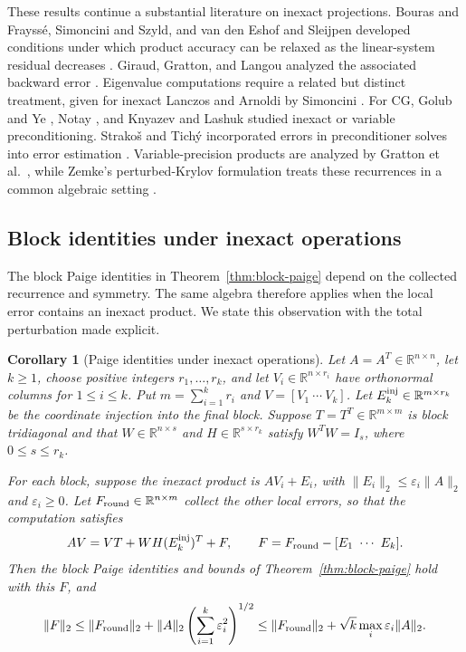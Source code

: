 \documentclass[11pt]{article}
\newtheorem{corollary}{Corollary}
\theoremstyle{definition}
\newcommand{\R}{\mathbb{R}}
\begin{document}
These results continue a substantial literature on inexact projections.
Bouras and Frayss\'e, Simoncini and Szyld, and van den Eshof and Sleijpen
developed conditions under which product accuracy can be relaxed as the
linear-system residual decreases
\cite{BourasFraysse2005,SimonciniSzyld2003,VanDenEshofSleijpen2004}.
Giraud, Gratton, and Langou analyzed the associated backward error
\cite{GiraudGrattonLangou2007}. Eigenvalue computations require a related
but distinct treatment, given for inexact Lanczos and Arnoldi by Simoncini
\cite{Simoncini2005}.
For CG, Golub and Ye \cite{GolubYe1999}, Notay \cite{Notay2000}, and
Knyazev and Lashuk \cite{KnyazevLashuk2007} studied inexact or variable
preconditioning. Strako\v{s} and Tich\'y incorporated errors in
preconditioner solves into error estimation \cite{StrakosTichy2005}.
Variable-precision products are analyzed by Gratton et al.\
\cite{GrattonSimonTitleyPeloquinToint2021}, while Zemke's perturbed-Krylov
formulation treats these recurrences in a common algebraic setting \cite{Zemke2007}.

\subsection{Block identities under inexact operations}

The block Paige identities in Theorem~\ref{thm:block-paige} depend on the
collected recurrence and symmetry. The same algebra therefore applies when
the local error contains an inexact product. We state this observation with
the total perturbation made explicit.

\begin{corollary}[Paige identities under inexact operations]
\label{cor:inexact-paige}
Let $A=A^T\in\R^{n\times n}$, let $k\ge1$, choose positive integers
$r_1,\ldots,r_k$, and let
$V_i\in\R^{n\times r_i}$ have orthonormal columns for $1\le i\le k$.
Put $m=\sum_{i=1}^k r_i$ and $V=[V_1\ \cdots\ V_k]$.
Let $E_k^{\rm inj}\in\R^{m\times r_k}$ be the coordinate injection into
the final block. Suppose $T=T^T\in\R^{m\times m}$ is block tridiagonal
and that $W\in\R^{n\times s}$ and $H\in\R^{s\times r_k}$ satisfy
$W^TW=I_s$, where $0\le s\le r_k$.

For each block, suppose the inexact product is $AV_i+E_i$, with
$\|E_i\|_2\le\varepsilon_i\|A\|_2$ and $\varepsilon_i\ge0$.
Let $F_{\rm round}\in\R^{n\times m}$ collect the other local errors, so
that the computation satisfies
\begin{equation}
 AV=VT+WH(E_k^{\rm inj})^T+F,\qquad
 F=F_{\rm round}-[E_1\ \cdots\ E_k].
 \label{eq:inexact-collected}
\end{equation}
Then the block Paige identities and bounds of
Theorem~\ref{thm:block-paige} hold with this $F$, and
\begin{equation}
 \|F\|_2\le\|F_{\rm round}\|_2+
 \|A\|_2\left(\sum_{i=1}^k\varepsilon_i^2\right)^{1/2}
 \le\|F_{\rm round}\|_2+\sqrt{k}\max_i\varepsilon_i\|A\|_2.
 \label{eq:inexact-total-error}
\end{equation}
\end{corollary}
\end{document}
